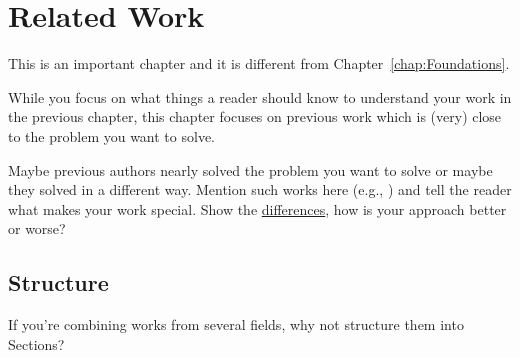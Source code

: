 \chapter{Related Work}\label{chap:relatedWork}
	This is an important chapter and it is different from Chapter~\ref{chap:Foundations}.
	
	While you focus on what things a reader should know to understand your work in the previous chapter, this chapter focuses on previous work which is (very) close to the problem you want to solve.
	
	Maybe previous authors nearly solved the problem you want to solve or maybe they solved in a different way.
	Mention such works here (e.g., \cite{Bush1945}) and tell the reader what makes your work special.
	Show the \underline{differences}, how is your approach better or worse?
	
	
	\section{Structure}
		If you're combining works from several fields, why not structure them into Sections?
	